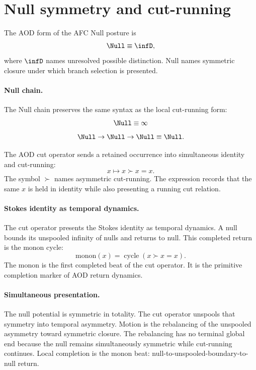 \section{Null symmetry and cut-running}\label{sec:null-cut-branch-hinge}

\begin{definition}
The AOD form of the AFC Null posture is
\[
\Null\equiv \infD,
\]
where \(\infD\) names unresolved possible distinction. Null names symmetric closure under which branch selection is presented.
\end{definition}

\paragraph{Null chain.}
The Null chain preserves the same syntax as the local cut-running form:
\[
\Null\equiv\infty
\]
\[
\Null\to\Null\to\Null\equiv\Null.
\]

\begin{definition}
The AOD cut operator sends a retained occurrence into simultaneous identity and cut-running:
\begin{equation}
x\mapsto x\succ x=x.
\label{eq:cut-running-form}
\end{equation}
The symbol \(\succ\) names asymmetric cut-running. The expression records that the same \(x\) is held in identity while also presenting a running cut relation.
\end{definition}

\paragraph{Stokes identity as temporal dynamics.}
The cut operator presents the Stokes identity as temporal dynamics. A null bounds its unspooled infinity of nulls and returns to null. This completed return is the monon cycle:
\begin{equation}
\mathrm{monon}(x)=\operatorname{cycle}(x\succ x=x).
\label{eq:monon-cycle}
\end{equation}
The monon is the first completed beat of the cut operator. It is the primitive completion marker of AOD return dynamics.

\paragraph{Simultaneous presentation.}
The null potential is symmetric in totality. The cut operator unspools that symmetry into temporal asymmetry. Motion is the rebalancing of the unspooled asymmetry toward symmetric closure. The rebalancing has no terminal global end because the null remains simultaneously symmetric while cut-running continues. Local completion is the monon beat: null-to-unspooled-boundary-to-null return.


